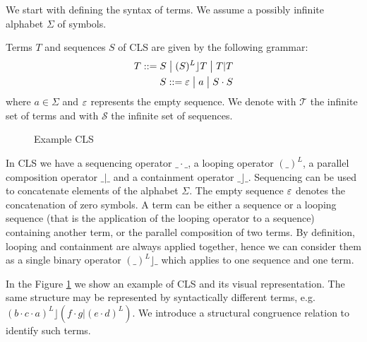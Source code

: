 We start with defining the syntax of terms. We assume a possibly infinite alphabet $\Sigma$ of symbols.

\begin{definition}
  Terms $T$ and sequences $S$ of CLS are given by the following grammar:
  \begin{align*}
    T ::= S \;\big|\; (S)^L\rfloor T \;\big|\; T|T\\
    S ::= \varepsilon \;\big|\; a \;\big|\; S\cdot S
  \end{align*}
  where $a\in \Sigma$ and $\varepsilon$ represents the empty sequence. We denote with $\mathcal T$ the infinite set of terms and with $\mathcal S$ the infinite set of sequences.
\end{definition}

\begin{figure}
  \centering
  \caption{Example CLS}
  \label{fig:example cls}
\end{figure}

In CLS we have a sequencing operator $\_\cdot\_$, a looping operator $(\_)^L$, a parallel composition operator $\_|\_$ and a containment operator $\_\rfloor\_$. Sequencing can be used to concatenate elements of the alphabet $\Sigma$. The empty sequence $\varepsilon$ denotes the concatenation of zero symbols. A term can be either a sequence or a looping sequence (that is the application of the looping operator to a sequence) containing another term, or the parallel composition of two terms. By definition, looping and containment are always applied together, hence we can consider them as a single binary operator $(\_)^L\rfloor\_$ which applies to one sequence and one term.

\begin{example}
  In the Figure \ref{fig:example cls} we show an example of CLS and its visual representation. The same structure may be represented by syntactically different terms, e.g. $(b\cdot c\cdot a)^L\rfloor (f\cdot g | (e\cdot d)^L)$. We introduce a structural congruence relation to identify such terms.
\end{example}

